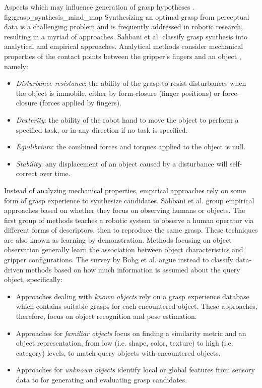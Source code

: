              {Aspects which may influence generation of grasp hypotheses \cite{Bohg2014}.}
             {fig:grasp_synthesis_mind_map}{\textwidth}
Synthesizing an optimal grasp from perceptual data is a challenging problem and is frequently addressed in robotic
research, resulting in a myriad of approaches. Sahbani et al. \cite{Sahbani2012} classify grasp synthesis into
analytical and empirical approaches. Analytical methods consider mechanical properties of the contact points between
the gripper's fingers and an object \cite{Roa2015, Sahbani2012, Shimoga1996}, namely:
\begin{itemize}
    \item \emph{Disturbance resistance}: the ability of the grasp to resist disturbances when the object is immobile,
    either by form-closure (finger positions) or force-closure (forces applied by fingers).
    \item \emph{Dexterity}: the ability of the robot hand to move the object to perform a specified task, or in any
    direction if no task is specified.
    \item \emph{Equilibrium}: the combined forces and torques applied to the object is null.
    \item \emph{Stability}: any displacement of an object caused by a disturbance will self-correct over time.
\end{itemize}
Instead of analyzing mechanical properties, empirical approaches rely on some form of grasp experience to synthesize
candidates. Sahbani et al. \cite{Sahbani2012} group empirical approaches based on whether they focus on observing humans
or objects. The first group of methods teaches a robotic system to observe a human operator via different forms of
descriptors, then to reproduce the same grasp. These techniques are also known as learning by demonstration. Methods
focusing on object observation generally learn the association between object characteristics and gripper
configurations. The survey by Bohg et al. \cite{Bohg2014} argue instead to classify data-driven methods based on how
much information is assumed about the query object, specifically:
\begin{itemize}
    \item Approaches dealing with \emph{known objects} rely on a grasp experience database which contains suitable
    grasps for each encountered object. These approaches, therefore, focus on object recognition and pose estimation.
    \item Approaches for \emph{familiar objects} focus on finding a similarity metric and an object representation,
    from low (i.e. shape, color, texture) to high (i.e. category) levels, to match query objects with encountered
    objects.
    \item Approaches for \emph{unknown objects} identify local or global features from sensory data to for generating
    and evaluating grasp candidates.
\end{itemize}
